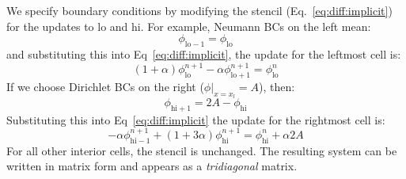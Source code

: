 We specify boundary conditions by modifying the stencil
(Eq.~\ref{eq:diff:implicit}) for the updates to $\mathrm{lo}$ and
$\mathrm{hi}$.  For example, Neumann BCs on the left mean:
\begin{equation}
\phi_\mathrm{lo-1} = \phi_\mathrm{lo}
\end{equation}
and substituting this into Eq~\ref{eq:diff:implicit}, the update for the leftmost cell is:
\begin{equation}
 (1 + \alpha) \phi_\mathrm{lo}^{n+1} -\alpha \phi_\mathrm{lo+1}^{n+1}  = 
  \phi_\mathrm{lo}^n
\end{equation}
If we choose Dirichlet BCs on the right ($\phi |_{x=x_l} = A$), then:
\begin{equation}
\phi_\mathrm{hi+1} = 2 A - \phi_\mathrm{hi}
\end{equation}
Substituting this into Eq~\ref{eq:diff:implicit} the update for the rightmost cell is:
\begin{equation}
- \alpha \phi_\mathrm{hi-1}^{n+1} + (1 + 3\alpha) \phi_\mathrm{hi}^{n+1}  =
  \phi_\mathrm{hi}^n + \alpha 2 A
\end{equation}
For all other interior cells, the stencil is unchanged.  The resulting
system can be written in matrix form and appears as a {\em tridiagonal}
matrix.  
